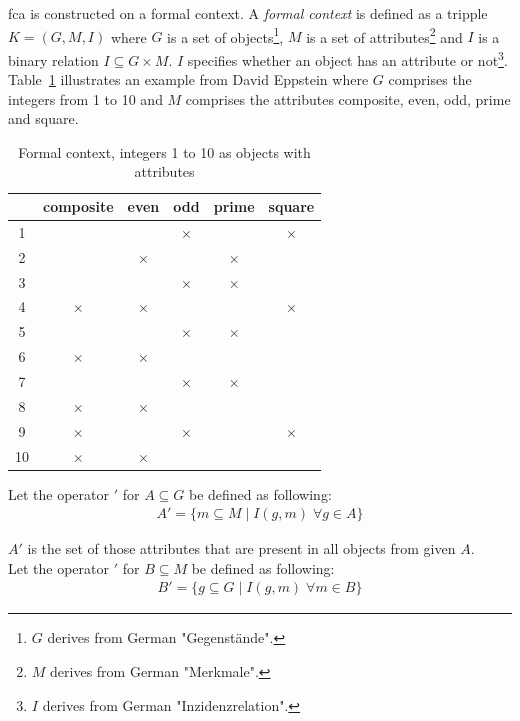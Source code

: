 \documentclass[11pt]{report}
\begin{document}
\acrshort{fca} \cite{Ganter2012} is constructed on a formal context. A \textit{formal context} is defined as a tripple $K = (G, M, I)$ where $G$ is a set of objects\footnote{$G$ derives from German "Gegenstände".}, $M$ is a set of attributes\footnote{$M$ derives from German "Merkmale".} and $I$ is a binary relation $I \subseteq G \times M$. $I$ specifies whether an object has an attribute or not\footnote{$I$ derives from German "Inzidenzrelation".}. Table~\ref{table:example} illustrates an example from David Eppstein \cite{fcaexample} where $G$ comprises the integers from 1 to 10 and $M$ comprises the attributes composite, even, odd, prime and square. \\


\begin{table}[h]
\caption{Formal context, integers 1 to 10 as objects with attributes}
\label{table:example}
\centering

\def\arraystretch{1.2}%
\begin{tabular}{ | c | c c c c c |}
\hline
  & composite & even & odd & prime & square\\
\hline

1 & & & $\times$ & &$\times$\\ 
2 & & $\times$ & & $\times$ &\\
3 & & & $\times$ & $\times$ &\\ 
4 & $\times$ & $\times$ & & & $\times$\\
5 & & & $\times$ & $\times$ &\\
6 & $\times$ & $\times$ & & &\\
7 & & & $\times$ & $\times$ &\\ 
8 & $\times$ & $\times$ & & &\\
9 & $\times$ & & $\times$ & & $\times$\\
10 & $\times$ & $\times$ & & &\\ \hline


\end{tabular}
\end{table}

Let the operator $'$ for $A \subseteq G$ be defined as following:
\begin{align*}
	A' = \{ m \subseteq M\; |\;  I(g, m)\;   \forall g \in A\}
\end{align*}

$A'$ is the set of those attributes that are present in all objects from given $A$. \\

Let the operator $'$ for $B \subseteq M$ be defined as following:
\begin{align*}
	B' = \{ g \subseteq G\; |\;  I(g, m)\;   \forall m \in B\}
\end{align*}
\end{document}
